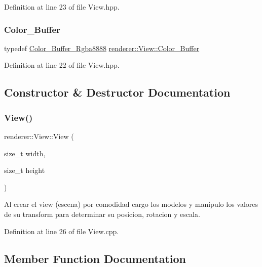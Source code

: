 Definition at line 23 of file View.\+hpp.

\mbox{\label{classrenderer_1_1_view_a21ded0a0afb4aea559b74d004cee798f}} 
\subsubsection{\texorpdfstring{Color\_Buffer}{Color\_Buffer}}
{\footnotesize\ttfamily typedef \mbox{\hyperlink{classrenderer_1_1_color___buffer___rgba8888}{Color\+\_\+\+Buffer\+\_\+\+Rgba8888}} \mbox{\hyperlink{classrenderer_1_1_view_a21ded0a0afb4aea559b74d004cee798f}{renderer\+::\+View\+::\+Color\+\_\+\+Buffer}}\hspace{0.3cm}{\ttfamily [private]}}



Definition at line 22 of file View.\+hpp.



\subsection{Constructor \& Destructor Documentation}
\mbox{\label{classrenderer_1_1_view_adc738c9a34cb291758e9a163c06b7024}} 
\subsubsection{\texorpdfstring{View()}{View()}}
{\footnotesize\ttfamily renderer\+::\+View\+::\+View (\begin{DoxyParamCaption}\item[{size\+\_\+t}]{width,  }\item[{size\+\_\+t}]{height }\end{DoxyParamCaption})}

Al crear el view (escena) por comodidad cargo los modelos y manipulo los valores de su transform para determinar su posicion, rotacion y escala. 

Definition at line 26 of file View.\+cpp.



\subsection{Member Function Documentation}
\mbox{\label{classrenderer_1_1_view_aea944e5b2ae8e4b6c403e4e0446ad021}} 
